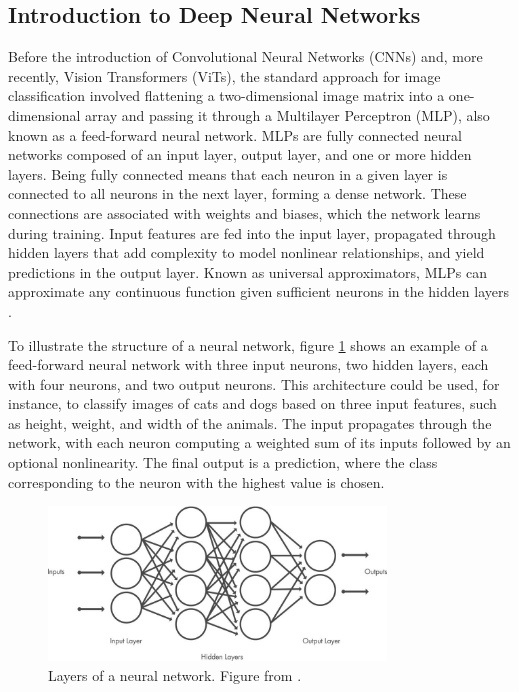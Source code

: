 

\subsection{Introduction to Deep Neural Networks}
Before the introduction of Convolutional Neural Networks (CNNs) and, more recently, Vision Transformers (ViTs), the standard approach for image classification involved flattening a two-dimensional image matrix into a one-dimensional array and passing it through a Multilayer Perceptron (MLP), also known as a feed-forward neural network. MLPs are fully connected neural networks composed of an input layer, output layer, and one or more hidden layers. Being fully connected means that each neuron in a given layer is connected to all neurons in the next layer, forming a dense network. These connections are associated with weights and biases, which the network learns during training. Input features are fed into the input layer, propagated through hidden layers that add complexity to model nonlinear relationships, and yield predictions in the output layer. Known as universal approximators, MLPs can approximate any continuous function given sufficient neurons in the hidden layers \cite{zhang2023dive,HORNIK1989359}.

To illustrate the structure of a neural network, figure \ref{fig:dnn_layers} shows an example of a feed-forward neural network with three input neurons, two hidden layers, each with four neurons, and two output neurons. This architecture could be used, for instance, to classify images of cats and dogs based on three input features, such as height, weight, and width of the animals. The input propagates through the network, with each neuron computing a weighted sum of its inputs followed by an optional nonlinearity. The final output is a prediction, where the class corresponding to the neuron with the highest value is chosen.

\begin{figure}[ht]
    \centering
    \includegraphics[width=0.8\textwidth]{Images/cnn_layers.jpg} 
    \caption{Layers of a neural network. Figure from \cite{mathworks_cnn}. }
    \label{fig:dnn_layers}
\end{figure}

